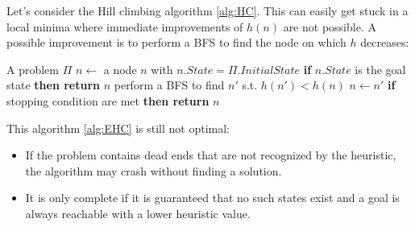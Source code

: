 \documentclass[10pt, letterpaper]{report}
\begin{document}
Let's consider the Hill climbing algorithm \ref{alg:HC}. This can easily get stuck in a local minima where immediate improvements of $h(n)$ are not possible. A possible improvement is to perform a BFS to find the node on which $h$ decreases:

 \begin{algorithm}
    \caption{Enforced Hill-Climbing}\label{alg:EHC}
    \begin{algorithmic}
    \Require A problem $\Pi$
    \State $n\leftarrow$ a node $n$ with $n.State=\Pi.InitialState$
    \State\textbf{if} $n.State$ is the goal state \textbf{then return} $n$ 
    \State perform a BFS to find $n'$ s.t. $h(n')<h(n)$
    \State $n\leftarrow n'$
    \State\textbf{if} stopping condition are met \textbf{then return} $n$ 
    \EndWhile
    \end{algorithmic}
\end{algorithm}\bigskip

\noindent This algorithm \ref{alg:EHC} is still not optimal:\begin{itemize}
    \item If the problem contains dead ends that are not recognized by the heuristic, the algorithm may crash without finding a solution.
    \item It is only complete if it is guaranteed that no such states exist and a goal is always reachable with a lower heuristic value.
\end{itemize}
\end{document}

